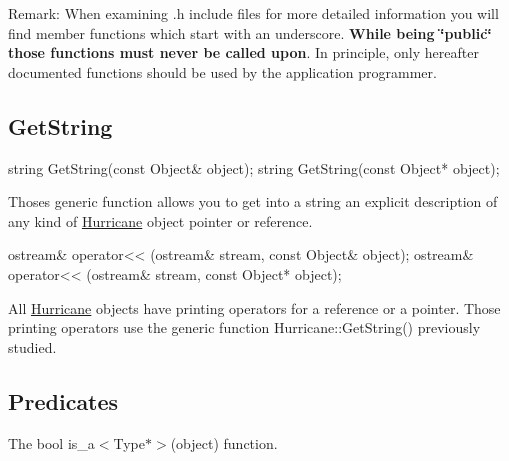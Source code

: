 \begin{DoxyParagraph}{Remark\+:}
When examining {\ttfamily }.h include files for more detailed information you will find member functions which start with an underscore. {\bfseries While being \char`\"{}public\char`\"{} those functions must never be called upon}. In principle, only here\textquotesingle{}after documented functions should be used by the application programmer.
\end{DoxyParagraph}
\hypertarget{group__Generalities_secGeneralitiesGetString}{}\subsection{Get\+String}\label{group__Generalities_secGeneralitiesGetString}

\begin{DoxyCode}
\textcolor{keywordtype}{string} GetString(\textcolor{keyword}{const} Object& \textcolor{keywordtype}{object});
\textcolor{keywordtype}{string} GetString(\textcolor{keyword}{const} Object* \textcolor{keywordtype}{object});
\end{DoxyCode}
 Thoses generic function allows you to get into a string an explicit description of any kind of \hyperlink{namespaceHurricane}{Hurricane} object pointer or reference. 
\begin{DoxyCode}
ostream& operator<< (ostream& stream, \textcolor{keyword}{const} Object& \textcolor{keywordtype}{object});
ostream& operator<< (ostream& stream, \textcolor{keyword}{const} Object* \textcolor{keywordtype}{object});
\end{DoxyCode}
 All \hyperlink{namespaceHurricane}{Hurricane} objects have printing operators for a reference or a pointer. Those printing operators use the generic function Hurricane\+::\+Get\+String() previously studied.\hypertarget{group__Generalities_secGeneralitiesPredicates}{}\subsection{Predicates}\label{group__Generalities_secGeneralitiesPredicates}
The {\ttfamily bool} {\ttfamily is\+\_\+a$<$\+Type$\ast$$>$(object)} function.

